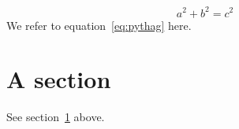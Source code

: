 \documentclass{article}
\begin{document}
\begin{equation}
a^2 + b^2 = c^2 \label{eq:pythag}
\end{equation}
We refer to equation~\ref{eq:pythag} here.
\section{A section}\label{sec:one}
See section~\ref{sec:one} above.
\end{document}

